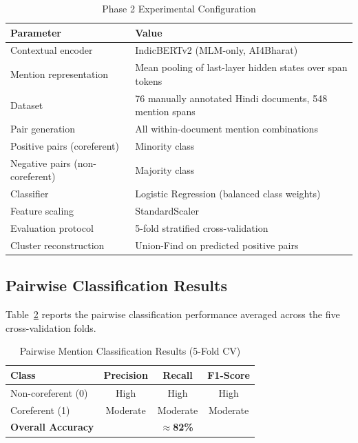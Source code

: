 \documentclass[12pt,a4paper]{report}
\begin{document}
\begin{table}[H]
\centering
\caption{Phase 2 Experimental Configuration}
\label{tab:p2_setup}
\begin{tabular}{|l|l|}
\hline
\textbf{Parameter} & \textbf{Value} \\
\hline
Contextual encoder & IndicBERTv2 (MLM-only, AI4Bharat) \\
Mention representation & Mean pooling of last-layer hidden states over span tokens \\
Dataset & 76 manually annotated Hindi documents, 548 mention spans \\
Pair generation & All within-document mention combinations \\
Positive pairs (coreferent) & Minority class \\
Negative pairs (non-coreferent) & Majority class \\
Classifier & Logistic Regression (balanced class weights) \\
Feature scaling & StandardScaler \\
Evaluation protocol & 5-fold stratified cross-validation \\
Cluster reconstruction & Union-Find on predicted positive pairs \\
\hline
\end{tabular}
\end{table}

\subsection{Pairwise Classification Results}

Table~\ref{tab:pair_results} reports the pairwise classification performance averaged across the five cross-validation folds.

\begin{table}[H]
\centering
\caption{Pairwise Mention Classification Results (5-Fold CV)}
\label{tab:pair_results}
\begin{tabular}{|l|c|c|c|}
\hline
\textbf{Class} & \textbf{Precision} & \textbf{Recall} & \textbf{F1-Score} \\
\hline
Non-coreferent (0) & High & High & High \\
Coreferent (1) & Moderate & Moderate & Moderate \\
\hline
\textbf{Overall Accuracy} & \multicolumn{3}{c|}{\textbf{$\approx$82\%}} \\
\hline
\end{tabular}
\end{table}
\end{document}
